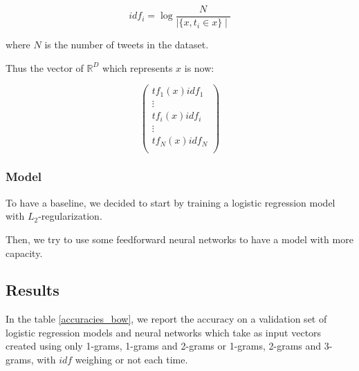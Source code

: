\documentclass[10pt,conference,compsocconf,retainorgcmds]{IEEEtran}
\begin{document}
$$
idf_i = \log{\frac{N}{\mid \{x, t_i \in x \} \mid}}
$$

where $N$ is the number of tweets in the dataset.

Thus the vector of $\mathbb{R}^D$ which represents $x$ is now:

$$
\left(
\begin{array}{c}
tf_1(x)idf_1 \\
\vdots \\
tf_i(x)idf_i \\
\vdots \\
tf_N(x)idf_N \\
\end{array}
\right)
$$

\subsubsection{Model}

To have a baseline, we decided to start by training a logistic regression model with $L_2$-regularization.

Then, we try to use some feedforward neural networks to have a model with more capacity.

\subsection{Results}

In the table \ref{accuracies_bow}, we report the accuracy on a validation set of logistic regression models and neural networks which take as input vectors created using only 1-grams, 1-grams and 2-grams or 1-grams, 2-grams and 3-grams, with $idf$ weighing or not each time.
\end{document}
